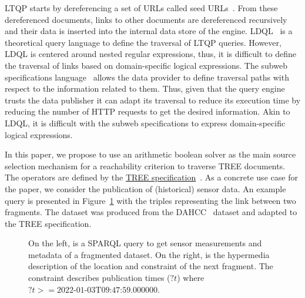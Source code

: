LTQP starts by dereferencing a set of URLs called seed URLs~\cite{Hartig2016}.
From these dereferenced documents, links to other documents are dereferenced recursively and their data is inserted into the internal data store of the engine.
LDQL~\cite{hartig2016Ldql} is a theoretical query language to define the traversal of LTQP queries.
However, LDQL is centered around nested regular expressions, thus, it is difficult to define the traversal of links based on domain-specific logical expressions.
The subweb specifications language~\cite{bogaerts_rulemlrr_2021} allows the data provider to define traversal paths with respect to the information related to them.
Thus, given that the query engine trusts the data publisher it can adapt its traversal to reduce its execution time by reducing the number of HTTP requests to get the desired information.
Akin to LDQL, it is difficult with the subweb specifications to express domain-specific logical expressions.

In this paper, we propose to use an arithmetic boolean solver as the main source selection mechanism for a reachability criterion to traverse TREE documents.
The operators are defined by the \href{https://treecg.github.io/specification/}{TREE specification}~.
As a concrete use case for the paper, we consider the publication of (historical) sensor data.
An example query is presented in Figure~\ref{lst:system} with the triples representing the link between two fragments.
The dataset was produced from the DAHCC~\cite{dahcc_resource} dataset and adapted to the TREE specification.

\begin{figure}[h]
    \begin{minipage}{0.50\textwidth}
        \centering
        
    \end{minipage}
    \hspace{0.05\textwidth}
    \begin{minipage}{0.43\textwidth}
        \centering
        
    \end{minipage}
    \caption{On the left, is a SPARQL query to get sensor measurements and metadata of a fragmented dataset.
    On the right, is the hypermedia description of the location and constraint of the next fragment.
    The constraint describes publication times ($?t$) where $?t>= \text{2022-01-03T09:47:59.000000}$.}
        \label{lst:system}
\end{figure}

